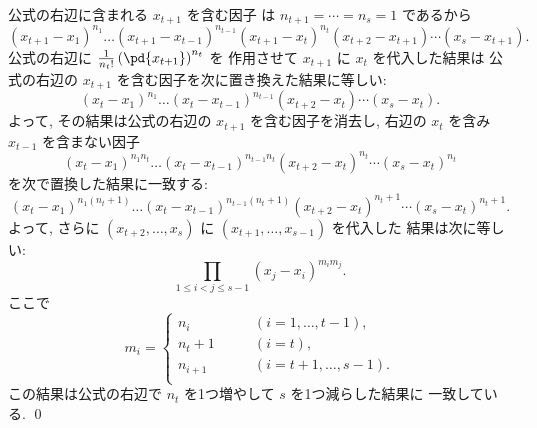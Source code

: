 \documentclass[12pt,twoside]{jarticle}
\begin{document}
公式の右辺に含まれる $x_{t+1}$ を含む因子
は $n_{t+1}=\cdots=n_s=1$ であるから
\begin{equation*}
  (x_{t+1}-x_1)^{n_1}\dots(x_{t+1}-x_{t-1})^{n_{t-1}}
  (x_{t+1}-x_t)^{n_t}
  (x_{t+2}-x_{t+1})\cdots(x_s-x_{t+1}).
\end{equation*}
公式の右辺に $\frac{1}{n_t!}\left(\pd{x_{t+1}}\right)^{n_t}$ を
作用させて $x_{t+1}$ に $x_t$ を代入した結果は
公式の右辺の $x_{t+1}$ を含む因子を次に置き換えた結果に等しい:
\begin{equation*}
  (x_t-x_1)^{n_1}\dots(x_t-x_{t-1})^{n_{t-1}}
  (x_{t+2}-x_t)\cdots(x_s-x_t).
\end{equation*}
よって, その結果は公式の右辺の $x_{t+1}$ を含む因子を消去し,
右辺の $x_t$ を含み $x_{t-1}$ を含まない因子
\begin{equation*}
  (x_t-x_1)^{n_1n_t}\dots(x_t-x_{t-1})^{n_{t-1}n_t}
  (x_{t+2}-x_t)^{n_t}\cdots(x_s-x_t)^{n_t}
\end{equation*}
を次で置換した結果に一致する:
\begin{equation*}
  (x_t-x_1)^{n_1(n_t+1)}\dots(x_t-x_{t-1})^{n_{t-1}(n_t+1)}
  (x_{t+2}-x_t)^{n_t+1}\cdots(x_s-x_t)^{n_t+1}.
\end{equation*}
よって, さらに $(x_{t+2},\dots,x_s)$ に $(x_{t+1},\dots,x_{s-1})$ を代入した
結果は次に等しい:
\begin{equation*}
  \prod_{1\le i<j\le s-1} (x_j - x_i)^{m_im_j}.
\end{equation*}
ここで
\begin{equation*}
  m_i = 
  \begin{cases}
    n_i     & \qquad (i=1,\dots,t-1), \\
    n_t + 1 & \qquad (i=t), \\
    n_{i+1} & \qquad (i=t+1,\dots,s-1). \\
  \end{cases}
\end{equation*}
この結果は公式の右辺で $n_t$ を1つ増やして $s$ を1つ減らした結果に
一致している.
\qed
\end{document}
